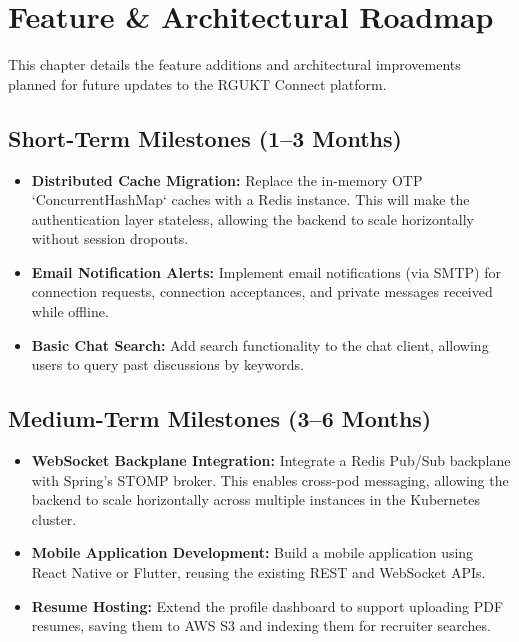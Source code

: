 \chapter{Feature \& Architectural Roadmap}
\label{ch:roadmap}

This chapter details the feature additions and architectural improvements planned for future updates to the RGUKT Connect platform.

\section{Short-Term Milestones (1--3 Months)}
\begin{itemize}
    \item \textbf{Distributed Cache Migration:} Replace the in-memory OTP `ConcurrentHashMap` caches with a Redis instance. This will make the authentication layer stateless, allowing the backend to scale horizontally without session dropouts.
    \item \textbf{Email Notification Alerts:} Implement email notifications (via SMTP) for connection requests, connection acceptances, and private messages received while offline.
    \item \textbf{Basic Chat Search:} Add search functionality to the chat client, allowing users to query past discussions by keywords.
\end{itemize}

\section{Medium-Term Milestones (3--6 Months)}
\begin{itemize}
    \item \textbf{WebSocket Backplane Integration:} Integrate a Redis Pub/Sub backplane with Spring's STOMP broker. This enables cross-pod messaging, allowing the backend to scale horizontally across multiple instances in the Kubernetes cluster.
    \item \textbf{Mobile Application Development:} Build a mobile application using React Native or Flutter, reusing the existing REST and WebSocket APIs.
    \item \textbf{Resume Hosting:} Extend the profile dashboard to support uploading PDF resumes, saving them to AWS S3 and indexing them for recruiter searches.
\end{itemize}

